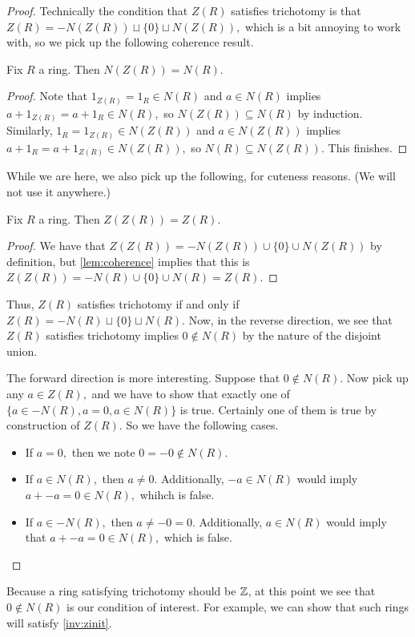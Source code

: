 \documentclass{article}
\begin{document}
\begin{proof}
	Technically the condition that $Z(R)$ satisfies trichotomy is that $Z(R)=-N(Z(R))\sqcup\{0\}\sqcup N(Z(R)),$ which is a bit annoying to work with, so we pick up the following coherence result.
	\begin{lemma} \label{lem:coherence}
		Fix $R$ a ring. Then $N(Z(R))=N(R).$
	\end{lemma}
	\begin{proof}
		Note that $1_{Z(R)}=1_R\in N(R)$ and $a\in N(R)$ implies $a+1_{Z(R)}=a+1_R\in N(R),$ so $N(Z(R))\subseteq N(R)$ by induction. Similarly, $1_R=1_{Z(R)}\in N(Z(R))$ and $a\in N(Z(R))$ implies $a+1_R=a+1_{Z(R)}\in N(Z(R)),$ so $N(R)\subseteq N(Z(R)).$ This finishes.
	\end{proof}
	While we are here, we also pick up the following, for cuteness reasons. (We will not use it anywhere.)
	\begin{corollary}
		Fix $R$ a ring. Then $Z(Z(R))=Z(R).$
	\end{corollary}
	\begin{proof}
		We have that $Z(Z(R))=-N(Z(R))\cup\{0\}\cup N(Z(R))$ by definition, but \autoref{lem:coherence} implies that this is $Z(Z(R))=-N(R)\cup\{0\}\cup N(R)=Z(R)$.
	\end{proof}
	Thus, $Z(R)$ satisfies trichotomy if and only if $Z(R)=-N(R)\sqcup\{0\}\sqcup N(R).$ Now, in the reverse direction, we see that $Z(R)$ satisfies trichotomy implies $0\notin N(R)$ by the nature of the disjoint union.

	The forward direction is more interesting. Suppose that $0\notin N(R).$ Now pick up any $a\in Z(R),$ and we have to show that exactly one of $\{a\in-N(R),a=0,a\in N(R)\}$ is true. Certainly one of them is true by construction of $Z(R).$ So we have the following cases.
	\begin{itemize}
		\item If $a=0,$ then we note $0=-0\notin N(R).$
		\item If $a\in N(R),$ then $a\ne0.$ Additionally, $-a\in N(R)$ would imply $a+-a=0\in N(R),$ whihch is false.
		\item If $a\in-N(R),$ then $a\ne-0=0.$ Additionally, $a\in N(R)$ would imply that $a+-a=0\in N(R),$ which is false.
		\qedhere
	\end{itemize}
\end{proof}
Because a ring satisfying trichotomy should be $\mathbb Z$, at this point we see that $0\notin N(R)$ is our condition of interest. For example, we can show that such rings will satisfy \autoref{inv:zinit}.
\end{document}
